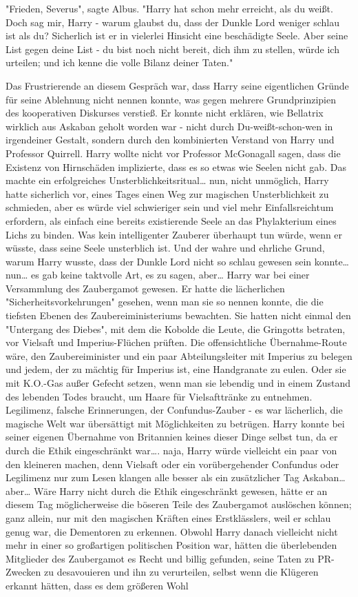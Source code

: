 {"Frieden, Severus", sagte Albus. "Harry hat schon mehr erreicht, als du weißt. Doch sag mir, Harry - warum glaubst du, dass der Dunkle Lord weniger schlau ist als du? Sicherlich ist er in vielerlei Hinsicht eine beschädigte Seele. Aber seine List gegen deine List - du bist noch nicht bereit, dich ihm zu stellen, würde ich urteilen; und ich kenne die volle Bilanz deiner Taten."

Das Frustrierende an diesem Gespräch war, dass Harry seine eigentlichen Gründe für seine Ablehnung nicht nennen konnte, was gegen mehrere Grundprinzipien des kooperativen Diskurses verstieß. Er konnte nicht erklären, wie Bellatrix wirklich aus Askaban geholt worden war - nicht durch Du-weißt-schon-wen in irgendeiner Gestalt, sondern durch den kombinierten Verstand von Harry und Professor Quirrell. Harry wollte nicht vor Professor McGonagall sagen, dass die Existenz von Hirnschäden implizierte, dass es so etwas wie Seelen nicht gab. Das machte ein erfolgreiches Unsterblichkeitsritual… nun, nicht unmöglich, Harry hatte sicherlich vor, eines Tages einen Weg zur magischen Unsterblichkeit zu schmieden, aber es würde viel schwieriger sein und viel mehr Einfallsreichtum erfordern, als einfach eine bereits existierende Seele an das Phylakterium eines Lichs zu binden. Was kein intelligenter Zauberer überhaupt tun würde, wenn er wüsste, dass seine Seele unsterblich ist. Und der wahre und ehrliche Grund, warum Harry wusste, dass der Dunkle Lord nicht so schlau gewesen sein konnte… nun… es gab keine taktvolle Art, es zu sagen, aber… Harry war bei einer Versammlung des Zaubergamot gewesen. Er hatte die lächerlichen "Sicherheitsvorkehrungen" gesehen, wenn man sie so nennen konnte, die die tiefsten Ebenen des Zaubereiministeriums bewachten. Sie hatten nicht einmal den "Untergang des Diebes", mit dem die Kobolde die Leute, die Gringotts betraten, vor Vielsaft und Imperius-Flüchen prüften. Die offensichtliche Übernahme-Route wäre, den Zaubereiminister und ein paar Abteilungsleiter mit Imperius zu belegen und jedem, der zu mächtig für Imperius ist, eine Handgranate zu eulen. Oder sie mit K.O.-Gas außer Gefecht setzen, wenn man sie lebendig und in einem Zustand des lebenden Todes braucht, um Haare für Vielsafttränke zu entnehmen. Legilimenz, falsche Erinnerungen, der Confundus-Zauber - es war lächerlich, die magische Welt war übersättigt mit Möglichkeiten zu betrügen. Harry konnte bei seiner eigenen Übernahme von Britannien keines dieser Dinge selbst tun, da er durch die Ethik eingeschränkt war…. naja, Harry würde vielleicht ein paar von den kleineren machen, denn Vielsaft oder ein vorübergehender Confundus oder Legilimenz nur zum Lesen klangen alle besser als ein zusätzlicher Tag Askaban… aber… Wäre Harry nicht durch die Ethik eingeschränkt gewesen, hätte er an diesem Tag möglicherweise die böseren Teile des Zaubergamot auslöschen können; ganz allein, nur mit den magischen Kräften eines Erstklässlers, weil er schlau genug war, die Dementoren zu erkennen. Obwohl Harry danach vielleicht nicht mehr in einer so großartigen politischen Position war, hätten die überlebenden Mitglieder des Zaubergamot es Recht und billig gefunden, seine Taten zu PR-Zwecken zu desavouieren und ihn zu verurteilen, selbst wenn die Klügeren erkannt hätten, dass es dem größeren Wohl }
